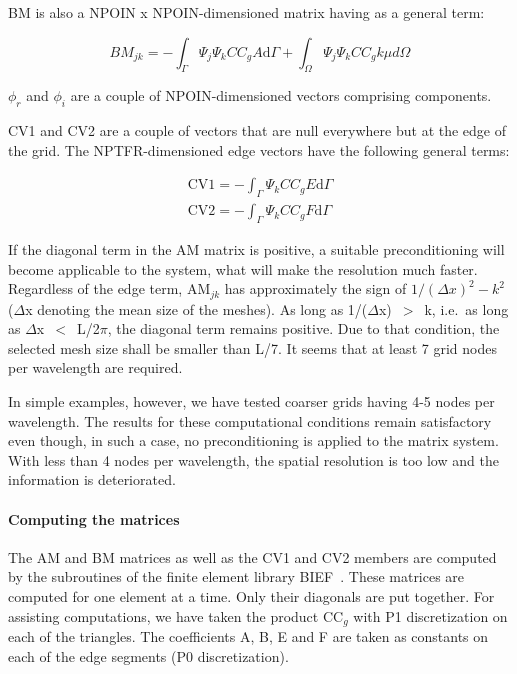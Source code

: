BM is also a NPOIN x NPOIN-dimensioned matrix having as a general term:

\begin{equation}
  BM_{jk} = -\int_\Gamma \Psi_j \Psi_k CC_g A \text{d}\Gamma +
             \int_\Omega \Psi_j \Psi_k CC_g k\mu d\Omega
  \label{eq:3.77}
\end{equation}

$\phi_{r}$ and $\phi_{i}$ are a couple of NPOIN-dimensioned vectors comprising  components.

CV1 and CV2 are a couple of vectors that are null everywhere but at the edge of
the grid. The NPTFR-dimensioned edge vectors have the following general terms:

\begin{equation}
  \begin{matrix}
  \text{CV1} = -\int_\Gamma \Psi_k CC_g E \text{d} \Gamma \\
  \text{CV2} = -\int_\Gamma \Psi_k CC_g F \text{d} \Gamma
  \end{matrix}
  \label{eq:3.78}
\end{equation}

If the diagonal term in the AM matrix is positive, a suitable preconditioning
will become applicable to the system, what will make the resolution much
faster. Regardless of the edge term, AM${}_{jk}$ has approximately the sign of $1/(\Delta x)^2-k^2$
($\Delta$x denoting the mean size of the meshes). As long as
1/($\Delta$x)~$\mathrm{>}$~k, i.e.\ as long as $\Delta$x~$\mathrm{<}$~L/2$\pi$,
the diagonal term remains positive. Due to that condition, the selected mesh
size shall be smaller than L/7. It seems that at least 7 grid nodes per
wavelength are required.

In simple examples, however, we have tested coarser grids having 4-5 nodes per
wavelength. The results for these computational conditions remain satisfactory
even though, in such a case, no preconditioning is applied to the matrix
system. With less than 4 nodes per wavelength, the spatial resolution is too
low and the information is deteriorated.


\paragraph{Computing the matrices}

The AM and BM matrices as well as the CV1 and CV2 members are computed by the
subroutines of the finite element library BIEF~\cite{Hervouet2006}. These
matrices are computed for one element at a time. Only their diagonals are put
together. For assisting computations, we have taken the product CC${}_{g}$ with
P1 discretization on each of the triangles. The coefficients A, B, E and F are
taken as constants on each of the edge segments (P0 discretization).

